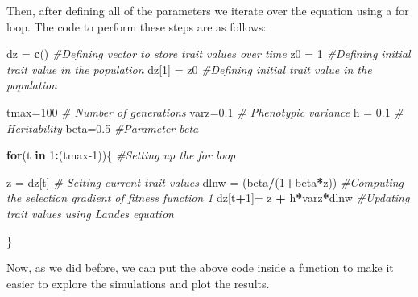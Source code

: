 \documentclass[
]{book}
\newenvironment{Shaded}{\begin{snugshade}}{\end{snugshade}}
\newcommand{\CommentTok}[1]{\textcolor[rgb]{0.56,0.35,0.01}{\textit{#1}}}
\newcommand{\ControlFlowTok}[1]{\textcolor[rgb]{0.13,0.29,0.53}{\textbf{#1}}}
\newcommand{\DecValTok}[1]{\textcolor[rgb]{0.00,0.00,0.81}{#1}}
\newcommand{\FloatTok}[1]{\textcolor[rgb]{0.00,0.00,0.81}{#1}}
\newcommand{\FunctionTok}[1]{\textcolor[rgb]{0.13,0.29,0.53}{\textbf{#1}}}
\newcommand{\NormalTok}[1]{#1}
\newcommand{\OtherTok}[1]{\textcolor[rgb]{0.56,0.35,0.01}{#1}}
\newcommand{\SpecialCharTok}[1]{\textcolor[rgb]{0.81,0.36,0.00}{\textbf{#1}}}
\begin{document}
Then, after defining all of the parameters we iterate over the equation using a for loop. The code to perform these steps are as follows:

\begin{Shaded}
\begin{Highlighting}[]
\NormalTok{dz }\OtherTok{=} \FunctionTok{c}\NormalTok{() }\CommentTok{\#Defining vector to store trait values over time}
\NormalTok{z0 }\OtherTok{=} \DecValTok{1} \CommentTok{\#Defining initial trait value in the population}
\NormalTok{dz[}\DecValTok{1}\NormalTok{] }\OtherTok{=}\NormalTok{ z0 }\CommentTok{\#Defining initial trait value in the population}

\NormalTok{tmax}\OtherTok{=}\DecValTok{100} \CommentTok{\# Number of generations}
\NormalTok{varz}\OtherTok{=}\FloatTok{0.1} \CommentTok{\# Phenotypic variance}
\NormalTok{h }\OtherTok{=} \FloatTok{0.1} \CommentTok{\# Heritability}
\NormalTok{beta}\OtherTok{=}\FloatTok{0.5} \CommentTok{\#Parameter beta}

\ControlFlowTok{for}\NormalTok{(t }\ControlFlowTok{in} \DecValTok{1}\SpecialCharTok{:}\NormalTok{(tmax}\DecValTok{{-}1}\NormalTok{))\{ }\CommentTok{\#Setting up the for loop}
  
\NormalTok{  z }\OtherTok{=}\NormalTok{ dz[t] }\CommentTok{\# Setting current trait values}
\NormalTok{  dlnw }\OtherTok{=}\NormalTok{ (beta}\SpecialCharTok{/}\NormalTok{(}\DecValTok{1}\SpecialCharTok{+}\NormalTok{beta}\SpecialCharTok{*}\NormalTok{z))  }\CommentTok{\#Computing the selection gradient of fitness function 1}
\NormalTok{  dz[t}\SpecialCharTok{+}\DecValTok{1}\NormalTok{]}\OtherTok{=}\NormalTok{ z }\SpecialCharTok{+}\NormalTok{ h}\SpecialCharTok{*}\NormalTok{varz}\SpecialCharTok{*}\NormalTok{dlnw }\CommentTok{\#Updating trait values using Lande\textquotesingle{}s equation}
  
\NormalTok{\}}
\end{Highlighting}
\end{Shaded}

Now, as we did before, we can put the above code inside a function to make it easier to explore the simulations and plot the results.
\end{document}
